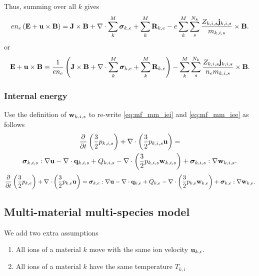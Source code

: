 \documentclass[a4paper,11pt]{report}
\begin{document}
Thus, summing over all $k$ gives
\begin{equation*}
    e n_e \left( \mathbf{E} + \mathbf{u} \times \mathbf{B} \right) = \mathbf{J} \times \mathbf{B} + \nabla \cdot \sum_k^M \bm \sigma_{k,e} + \sum_k^M \mathbf{R}_{k,e} - e \sum_k^M \sum_s^{N_k} \frac{Z_{k,i,s} \mathbf{j}_{k,i,s}}{m_{k,i,s}} \times \mathbf{B}.
\end{equation*}
or
\begin{equation}
    \mathbf{E} + \mathbf{u} \times \mathbf{B} = \frac{1}{e n_e} \left( \mathbf{J} \times \mathbf{B} + \nabla \cdot \sum_k^M \bm \sigma_{k,e} + \sum_k^M \mathbf{R}_{k,e} \right) - \sum_k^M \sum_s^{N_k} \frac{Z_{k,i,s} \mathbf{j}_{k,i,s}}{n_e m_{k,i,s}} \times \mathbf{B}.
\end{equation}

\subsubsection{Internal energy}

Use the definition of $\mathbf{w}_{k,i,s}$ to re-write \cref{eq:mf_mm_iei} and \cref{eq:mf_mm_iee} as follows
\begin{multline*}
    \frac{\partial}{\partial t} \left( \frac{3}{2} p_{k,i,s} \right) + \nabla \cdot \left( \frac{3}{2} p_{k,i,s} \mathbf{u} \right) = \\
    \bm \sigma_{k,i,s} : \nabla \mathbf{u} - \nabla \cdot \mathbf{q}_{k,i,s} + Q_{k,i,s} - \nabla \cdot \left( \frac{3}{2} p_{k,i,s} \mathbf{w}_{k,i,s} \right) + \bm \sigma_{k,i,s} : \nabla \mathbf{w}_{k,i,s} .
\end{multline*}
\begin{equation*}
    \frac{\partial}{\partial t} \left( \frac{3}{2} p_{k,e} \right) + \nabla \cdot \left( \frac{3}{2} p_{k,e} \mathbf{u} \right) = \bm \sigma_{k,e} : \nabla \mathbf{u} - \nabla \cdot \mathbf{q}_{k,e} + Q_{k,e} - \nabla \cdot \left( \frac{3}{2} p_{k,e} \mathbf{w}_{k,e} \right) + \bm \sigma_{k,e} : \nabla \mathbf{w}_{k,e}.
\end{equation*}

\subsection{Multi-material multi-species model}
\label{sec:sf_mm_ms}

We add two extra assumptions
\begin{enumerate}
    \item All ions of a material $k$ move with the same ion velocity $\mathbf{u}_{k,i}$. \label{eq:single_ion_vel}
    \item All ions of a material $k$ have the same temperature $T_{k,i}$ \label{eq:single_ion_T}
\end{enumerate}
\end{document}
